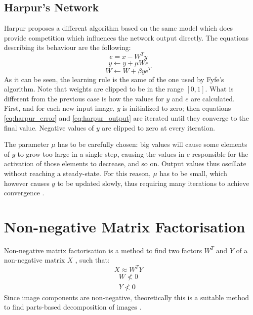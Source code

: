\documentclass[11pt,a4paper]{report}
\begin{document}
			\subsection{Harpur's Network}
				Harpur proposes a different algorithm based on the same model \cite{harpur1994fast,harpur1996development,harpur1997low} which does provide competition which influences the network output directly. The equations describing its behaviour are the following:
				\begin{equation}
					\label{eq:harpur_error}
					e = x - W^Ty
				\end{equation}
				\begin{equation}
					\label{eq:harpur_output}
					y \leftarrow y + \mu W e
				\end{equation}
				\begin{equation}
					W \leftarrow W + \beta y e^T
				\end{equation}
				As it can be seen, the learning rule is the same of the one used by Fyfe's algorithm. Note that weights are clipped to be in the range $[0,1]$. What is different from the previous case is how the values for $y$ and $e$ are calculated. First, and for each new input image, $y$ is initialized to zero; then equations \ref{eq:harpur_error} and \ref{eq:harpur_output} are iterated until they converge to the final value. Negative values of $y$ are clipped to zero at every iteration.
				
				The parameter $\mu$ has to be carefully chosen: big values will cause some elements of $y$ to grow too large in a single step, causing the values in $e$ responsible for the activation of those elements to decrease, and so on. Output values thus oscillate without reaching a steady-state. For this reason, $\mu$ has to be small, which however causes $y$ to be updated slowly, thus requiring many iterations to achieve convergence \cite{spratling2009unsupervised}.
	
		\section{Non-negative Matrix Factorisation}
			Non-negative matrix factorisation is a method to find two factors $W^T$ and $Y$ of a non-negative matrix $X$  \cite{spratling2009unsupervised}, such that:
			\begin{equation}
				X \approx W^T Y
			\end{equation}
			\begin{equation}
				\begin{split}
					W \nless 0 \\
					Y \nless 0
				\end{split}
			\end{equation}
			Since image components are non-negative, theoretically this is a suitable method to find parts-based decomposition of images \cite{feng2002local}. 
			
\end{document}
